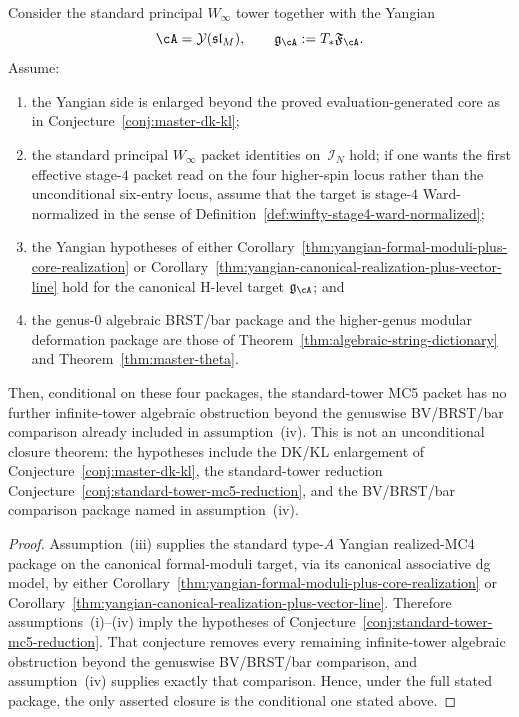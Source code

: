 \begin{corollary}
\label{cor:standard-tower-mc5-closure}
Consider the standard principal
\texorpdfstring{$W_\infty$}{W_infty} tower together with the Yangian
\[
\cA=\mathcal{Y}(\mathfrak{sl}_M),
\qquad
\mathfrak{g}_{\cA}:=T_*\mathfrak{F}_{\cA}.
\]
Assume:
\begin{enumerate}[label=\textup{(\roman*)}]
\item the Yangian side is enlarged beyond the proved
 evaluation-generated core as in
 Conjecture~\ref{conj:master-dk-kl};
\item the standard principal \texorpdfstring{$W_\infty$}{W_infty}
 packet identities on~$\mathcal{I}_N$ hold; if one wants the first
 effective stage-$4$ packet read on the four higher-spin locus rather than
 the unconditional six-entry locus, assume that the target is
 stage-$4$ Ward-normalized in the sense of
 Definition~\ref{def:winfty-stage4-ward-normalized};
\item the Yangian hypotheses of
 either Corollary~\ref{thm:yangian-formal-moduli-plus-core-realization}
 or Corollary~\ref{thm:yangian-canonical-realization-plus-vector-line}
 hold for the canonical H-level target $\mathfrak{g}_{\cA}$; and
\item the genus-$0$ algebraic BRST/bar package and the higher-genus
 modular deformation package are those of
 Theorem~\ref{thm:algebraic-string-dictionary} and
 Theorem~\ref{thm:master-theta}.
\end{enumerate}
Then, conditional on these four packages, the standard-tower MC5
packet has no further infinite-tower algebraic obstruction beyond the
genuswise BV/BRST/bar comparison already included in
assumption~\textup{(iv)}. This is not an unconditional closure theorem:
the hypotheses include the DK/KL enlargement of
Conjecture~\ref{conj:master-dk-kl}, the standard-tower reduction
Conjecture~\ref{conj:standard-tower-mc5-reduction}, and the
BV/BRST/bar comparison package named in assumption~\textup{(iv)}.
\end{corollary}

\begin{proof}
Assumption~\textup{(iii)} supplies the standard type-$A$ Yangian
realized-MC4 package on the canonical formal-moduli target, via its
canonical associative dg model, by either
Corollary~\ref{thm:yangian-formal-moduli-plus-core-realization} or
Corollary~\ref{thm:yangian-canonical-realization-plus-vector-line}.
Therefore assumptions~\textup{(i)}--\textup{(iv)} imply the hypotheses
of Conjecture~\ref{conj:standard-tower-mc5-reduction}. That
conjecture removes every remaining infinite-tower algebraic
obstruction beyond the genuswise BV/BRST/bar comparison, and
assumption~\textup{(iv)} supplies exactly that comparison. Hence, under
the full stated package, the only asserted closure is the conditional
one stated above.
\end{proof}


